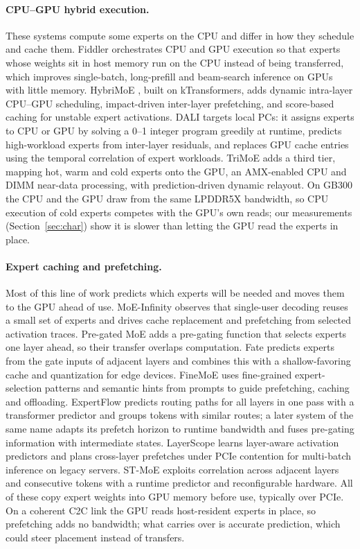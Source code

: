 \documentclass{article}
\newcommand{\secref}[1]{Section~\ref{#1}}
\begin{document}
\paragraph{CPU--GPU hybrid execution.} These systems compute some experts on the CPU and differ in how they schedule and
cache them. Fiddler \citep{fiddler} orchestrates CPU and GPU execution so that experts whose weights sit in host memory
run on the CPU instead of being transferred, which improves single-batch, long-prefill and beam-search inference on
GPUs with little memory. HybriMoE \citep{hybrimoe}, built on kTransformers, adds dynamic intra-layer CPU--GPU
scheduling, impact-driven inter-layer prefetching, and score-based caching for unstable expert activations. DALI
\citep{dali} targets local PCs: it assigns experts to CPU or GPU by solving a 0--1 integer program greedily at runtime,
predicts high-workload experts from inter-layer residuals, and replaces GPU cache entries using the temporal correlation
of expert workloads. TriMoE \citep{trimoe} adds a third tier, mapping hot, warm and cold experts onto the GPU, an
AMX-enabled CPU and DIMM near-data processing, with prediction-driven dynamic relayout. On GB300 the CPU and the GPU
draw from the same LPDDR5X bandwidth, so CPU execution of cold experts competes with the GPU's own reads; our
measurements (\secref{sec:char}) show it is slower than letting the GPU read the experts in place.

\paragraph{Expert caching and prefetching.} Most of this line of work predicts which experts will be needed and moves
them to the GPU ahead of use. MoE-Infinity \citep{moeinfinity} observes that single-user decoding reuses a small set of
experts and drives cache replacement and prefetching from selected activation traces. Pre-gated MoE \citep{pregated}
adds a pre-gating function that selects experts one layer ahead, so their transfer overlaps computation. Fate
\citep{fate} predicts experts from the gate inputs of adjacent layers and combines this with a shallow-favoring cache
and quantization for edge devices. FineMoE \citep{fmoe} uses fine-grained expert-selection patterns and semantic hints
from prompts to guide prefetching, caching and offloading. ExpertFlow \citep{expertflow24} predicts routing paths for
all layers in one pass with a transformer predictor and groups tokens with similar routes; a later system of the same
name \citep{expertflow25} adapts its prefetch horizon to runtime bandwidth and fuses pre-gating information with
intermediate states. LayerScope \citep{layerscope} learns layer-aware activation predictors and plans cross-layer
prefetches under PCIe contention for multi-batch inference on legacy servers. ST-MoE \citep{stmoe} exploits correlation
across adjacent layers and consecutive tokens with a runtime predictor and reconfigurable hardware. All of these copy
expert weights into GPU memory before use, typically over PCIe. On a coherent C2C link the GPU reads host-resident
experts in place, so prefetching adds no bandwidth; what carries over is accurate prediction, which could steer
placement instead of transfers.
\end{document}
